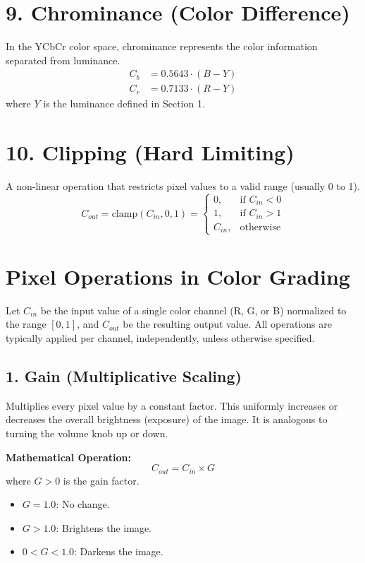 \documentclass[UTF8]{ctexart}
\begin{document}
\section*{9. Chrominance (Color Difference)}
In the YCbCr color space, chrominance represents the color information separated from luminance.
\begin{align}
	C_b &= 0.5643 \cdot (B - Y) \\
	C_r &= 0.7133 \cdot (R - Y)
\end{align}
where $Y$ is the luminance defined in Section 1.

\section*{10. Clipping (Hard Limiting)}
A non-linear operation that restricts pixel values to a valid range (usually 0 to 1).
\begin{equation}
	C_{out} = \text{clamp}(C_{in}, 0, 1) = 
	\begin{cases} 
		0, & \text{if } C_{in} < 0 \\
		1, & \text{if } C_{in} > 1 \\
		C_{in}, & \text{otherwise}
	\end{cases}
\end{equation}


\section*{Pixel Operations in Color Grading}

Let \( C_{in} \) be the input value of a single color channel (R, G, or B) normalized to the range \([0, 1]\), and \( C_{out} \) be the resulting output value. 
All operations are typically applied per channel, independently, unless otherwise specified.

\subsection*{1. Gain (Multiplicative Scaling)}
Multiplies every pixel value by a constant factor. This uniformly increases or decreases the overall brightness (exposure) of the image. It is analogous to turning the volume knob up or down.

\textbf{Mathematical Operation:}
\begin{equation}
	C_{out} = C_{in} \times G
\end{equation}
where \( G > 0 \) is the gain factor.
\begin{itemize}
	\item \( G = 1.0 \): No change.
	\item \( G > 1.0 \): Brightens the image.
	\item \( 0 < G < 1.0 \): Darkens the image.
\end{itemize}
\end{document}
